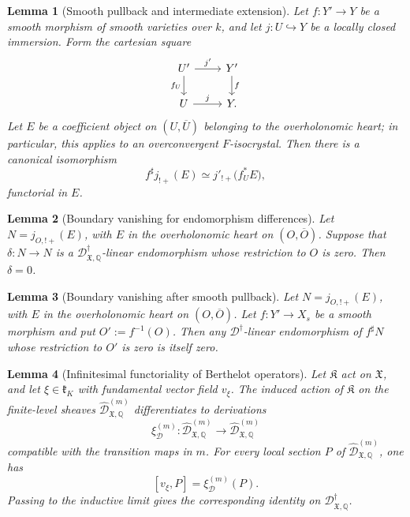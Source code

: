 \documentclass[10pt,a4paper]{amsart}
\newtheorem{lemma}{Lemma}
\begin{document}
\begin{lemma}[Smooth pullback and intermediate extension]
\label{lem:smooth-pullback-intermediate-extension}
Let \(f:Y'\to Y\) be a smooth morphism of smooth varieties over \(k\), and let
\(j:U\hookrightarrow Y\) be a locally closed immersion. Form the cartesian
square
\[
\begin{tikzcd}
  U' \arrow[r,"j'"] \arrow[d,"f_U"'] &
  Y' \arrow[d,"f"] \\
  U \arrow[r,"j"] &
  Y.
\end{tikzcd}
\]
Let \(E\) be a coefficient object on \((U,\overline U)\) belonging to the
overholonomic heart; in particular, this applies to an overconvergent
\(F\)-isocrystal. Then there is a canonical isomorphism
\[
  f^\sharp j_{!+}(E)
  \simeq
  j'_{!+}\bigl(f_U^*E\bigr),
\]
functorial in \(E\).
\end{lemma}

\begin{lemma}[Boundary vanishing for endomorphism differences]
\label{lem:boundary-vanishing-endomorphism-difference}
Let \(N=j_{O,!+}(E)\), with \(E\) in the overholonomic heart on
\((O,\overline O)\). Suppose that \(\delta:N\to N\) is a
\(\mathscr D^\dagger_{\mathfrak X,\mathbb Q}\)-linear endomorphism whose
restriction to \(O\) is zero. Then \(\delta=0\).
\end{lemma}

\begin{lemma}[Boundary vanishing after smooth pullback]
\label{lem:boundary-vanishing-smooth-pullback}
Let \(N=j_{O,!+}(E)\), with \(E\) in the overholonomic heart on
\((O,\overline O)\). Let \(f:Y'\to X_s\) be a smooth morphism and put
\(O':=f^{-1}(O)\). Then any
\(\mathscr D^\dagger\)-linear endomorphism of \(f^\sharp N\) whose restriction
to \(O'\) is zero is itself zero.
\end{lemma}

\begin{lemma}[Infinitesimal functoriality of Berthelot operators]
\label{lem:infinitesimal-functoriality-operators}
Let \(\mathfrak K\) act on \(\mathfrak X\), and let
\(\xi\in\mathfrak k_K\) with fundamental vector field \(v_\xi\). The induced
action of \(\mathfrak K\) on the finite-level sheaves
\(\widehat{\mathscr D}^{(m)}_{\mathfrak X,\mathbb Q}\) differentiates to
derivations
\[
  \xi_{\mathscr D}^{(m)}:
  \widehat{\mathscr D}^{(m)}_{\mathfrak X,\mathbb Q}
  \longrightarrow
  \widehat{\mathscr D}^{(m)}_{\mathfrak X,\mathbb Q}
\]
compatible with the transition maps in \(m\). For every local section
\(P\) of \(\widehat{\mathscr D}^{(m)}_{\mathfrak X,\mathbb Q}\), one has
\[
  [v_\xi,P]=\xi_{\mathscr D}^{(m)}(P).
\]
Passing to the inductive limit gives the corresponding identity on
\(\mathscr D^\dagger_{\mathfrak X,\mathbb Q}\).
\end{lemma}
\end{document}
